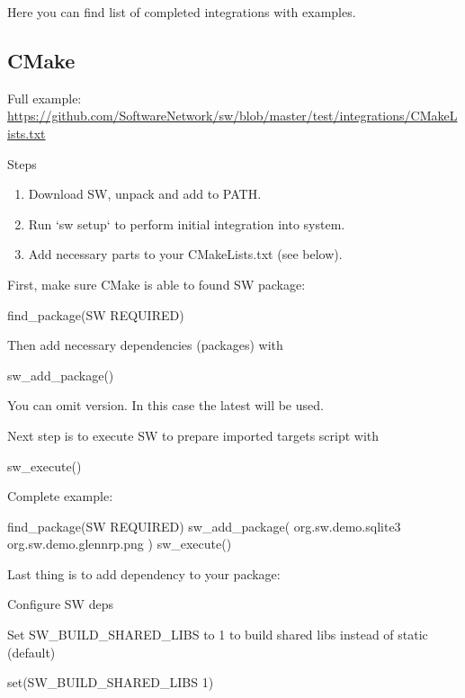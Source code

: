 Here you can find list of completed integrations with examples.

\subsection{CMake}


Full example:\\
\url{https://github.com/SoftwareNetwork/sw/blob/master/test/integrations/CMakeLists.txt}

Steps
\begin{enumerate}
\item
Download SW, unpack and add to PATH.
\item
Run `sw setup` to perform initial integration into system.
\item
Add necessary parts to your CMakeLists.txt (see below).
\end{enumerate}

First, make sure CMake is able to found SW package:
\begin{cmake}
find_package(SW REQUIRED)
\end{cmake}

Then add necessary dependencies (packages) with
\begin{cmake}
sw_add_package()
\end{cmake}

You can omit version. In this case the latest will be used.

Next step is to execute SW to prepare imported targets script with
\begin{cmake}
sw_execute()
\end{cmake}

Complete example:
\begin{cmake}
find_package(SW REQUIRED)
sw_add_package(
    org.sw.demo.sqlite3
    org.sw.demo.glennrp.png
)
sw_execute()
\end{cmake}

Last thing is to add dependency to your package:

Configure SW deps

Set SW_BUILD_SHARED_LIBS to 1 to build shared libs instead of static (default)
\begin{cmake}
set(SW_BUILD_SHARED_LIBS 1)
\end{cmake}


